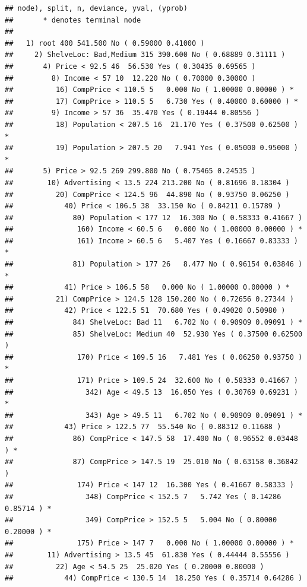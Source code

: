 \documentclass[
  11pt,
]{article}
\begin{document}
\begin{verbatim}
## node), split, n, deviance, yval, (yprob)
##       * denotes terminal node
## 
##   1) root 400 541.500 No ( 0.59000 0.41000 )  
##     2) ShelveLoc: Bad,Medium 315 390.600 No ( 0.68889 0.31111 )  
##       4) Price < 92.5 46  56.530 Yes ( 0.30435 0.69565 )  
##         8) Income < 57 10  12.220 No ( 0.70000 0.30000 )  
##          16) CompPrice < 110.5 5   0.000 No ( 1.00000 0.00000 ) *
##          17) CompPrice > 110.5 5   6.730 Yes ( 0.40000 0.60000 ) *
##         9) Income > 57 36  35.470 Yes ( 0.19444 0.80556 )  
##          18) Population < 207.5 16  21.170 Yes ( 0.37500 0.62500 ) *
##          19) Population > 207.5 20   7.941 Yes ( 0.05000 0.95000 ) *
##       5) Price > 92.5 269 299.800 No ( 0.75465 0.24535 )  
##        10) Advertising < 13.5 224 213.200 No ( 0.81696 0.18304 )  
##          20) CompPrice < 124.5 96  44.890 No ( 0.93750 0.06250 )  
##            40) Price < 106.5 38  33.150 No ( 0.84211 0.15789 )  
##              80) Population < 177 12  16.300 No ( 0.58333 0.41667 )  
##               160) Income < 60.5 6   0.000 No ( 1.00000 0.00000 ) *
##               161) Income > 60.5 6   5.407 Yes ( 0.16667 0.83333 ) *
##              81) Population > 177 26   8.477 No ( 0.96154 0.03846 ) *
##            41) Price > 106.5 58   0.000 No ( 1.00000 0.00000 ) *
##          21) CompPrice > 124.5 128 150.200 No ( 0.72656 0.27344 )  
##            42) Price < 122.5 51  70.680 Yes ( 0.49020 0.50980 )  
##              84) ShelveLoc: Bad 11   6.702 No ( 0.90909 0.09091 ) *
##              85) ShelveLoc: Medium 40  52.930 Yes ( 0.37500 0.62500 )  
##               170) Price < 109.5 16   7.481 Yes ( 0.06250 0.93750 ) *
##               171) Price > 109.5 24  32.600 No ( 0.58333 0.41667 )  
##                 342) Age < 49.5 13  16.050 Yes ( 0.30769 0.69231 ) *
##                 343) Age > 49.5 11   6.702 No ( 0.90909 0.09091 ) *
##            43) Price > 122.5 77  55.540 No ( 0.88312 0.11688 )  
##              86) CompPrice < 147.5 58  17.400 No ( 0.96552 0.03448 ) *
##              87) CompPrice > 147.5 19  25.010 No ( 0.63158 0.36842 )  
##               174) Price < 147 12  16.300 Yes ( 0.41667 0.58333 )  
##                 348) CompPrice < 152.5 7   5.742 Yes ( 0.14286 0.85714 ) *
##                 349) CompPrice > 152.5 5   5.004 No ( 0.80000 0.20000 ) *
##               175) Price > 147 7   0.000 No ( 1.00000 0.00000 ) *
##        11) Advertising > 13.5 45  61.830 Yes ( 0.44444 0.55556 )  
##          22) Age < 54.5 25  25.020 Yes ( 0.20000 0.80000 )  
##            44) CompPrice < 130.5 14  18.250 Yes ( 0.35714 0.64286 )  

\end{verbatim}
\end{document}

